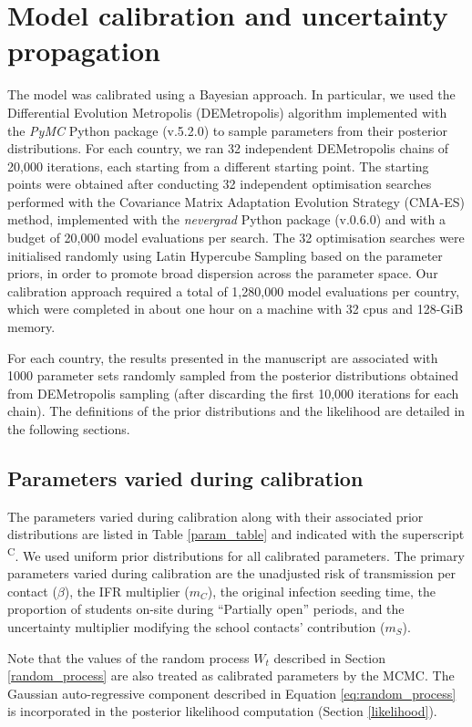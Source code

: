 \section{Model calibration and uncertainty propagation}
\label{calibration}
The model was calibrated using a Bayesian approach. In particular, we used the Differential Evolution Metropolis 
(DEMetropolis) algorithm implemented with the \textit{PyMC} Python package (v.5.2.0) to sample parameters from their 
posterior distributions. For each country, we ran 32 independent DEMetropolis chains of 20,000 iterations, each 
starting from a different starting point. The starting points were obtained after conducting 32 independent optimisation 
searches performed with the Covariance Matrix Adaptation Evolution Strategy (CMA-ES) method, implemented with the
\textit{nevergrad} Python package (v.0.6.0) and with a budget of 20,000 model evaluations per search. 
The 32 optimisation searches were initialised randomly using Latin Hypercube Sampling based on the parameter priors, 
in order to promote broad dispersion across the parameter space. Our calibration approach required a total of 1,280,000
model evaluations per country, which were completed in about one hour on a machine with 32 cpus and 128-GiB memory.

For each country, the results presented in the manuscript are associated with 1000 parameter sets randomly sampled from 
the posterior distributions obtained from DEMetropolis sampling (after discarding the first 10,000 iterations for each chain). 
The definitions of the prior distributions and the likelihood are detailed in the following sections.

\subsection{Parameters varied during calibration}

The parameters varied during calibration along with their associated prior distributions 
are listed in Table \ref{param_table} and indicated with the superscript \textsuperscript{C}.
We used uniform prior distributions for all calibrated parameters. The primary parameters varied during calibration are 
the unadjusted risk of transmission per contact ($\beta$), the IFR multiplier ($m_C$), the original infection seeding time,
the proportion of students on-site during ``Partially open'' periods, and the uncertainty multiplier modifying the school 
contacts' contribution ($m_S$). 

Note that the values of the random process $W_t$ described in Section \ref{random_process} are also treated as calibrated parameters by the MCMC. The Gaussian 
auto-regressive component described in Equation \ref{eq:random_process} is incorporated in the posterior likelihood 
computation (Section \ref{likelihood}).

